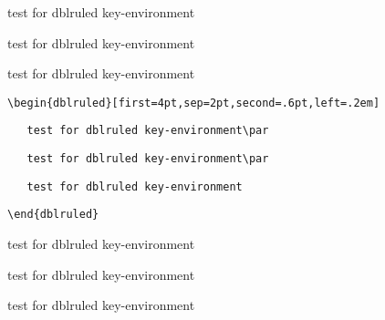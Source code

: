 \documentclass[a4paper]{article}
\begin{document}
\begin{dblruled}
 test for dblruled key-environment\par
 test for dblruled key-environment\par
 test for dblruled key-environment
\end{dblruled}

\verb+\begin{dblruled}[first=4pt,sep=2pt,second=.6pt,left=.2em]+\par
\verb+   test for dblruled key-environment\par+\par
\verb+   test for dblruled key-environment\par+\par
\verb+   test for dblruled key-environment+\par
\verb+\end{dblruled}+

\begin{dblruled}[first=4pt,sep=2pt,second=.6pt,left=.2em]
 test for dblruled key-environment\par
 test for dblruled key-environment\par
 test for dblruled key-environment
\end{dblruled}
\end{document}
